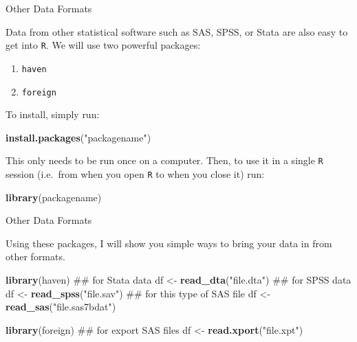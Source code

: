 \documentclass[ignorenonframetext,]{beamer}
\newenvironment{Shaded}{\begin{snugshade}}{\end{snugshade}}
\newcommand{\KeywordTok}[1]{\textcolor[rgb]{0.13,0.29,0.53}{\textbf{{#1}}}}
\newcommand{\StringTok}[1]{\textcolor[rgb]{0.31,0.60,0.02}{{#1}}}
\newcommand{\NormalTok}[1]{{#1}}
\providecommand{\tightlist}{%
\setlength{\itemsep}{0pt}\setlength{\parskip}{0pt}}
\begin{document}
\begin{frame}[fragile]{Other Data Formats}

Data from other statistical software such as SAS, SPSS, or Stata are
also easy to get into \texttt{R}. We will use two powerful packages:

\begin{enumerate}
\def\labelenumi{\arabic{enumi}.}
\tightlist
\item
  \texttt{haven}
\item
  \texttt{foreign}
\end{enumerate}

To install, simply run:

\begin{Shaded}
\begin{Highlighting}[]
\KeywordTok{install.packages}\NormalTok{(}\StringTok{"packagename"}\NormalTok{)}
\end{Highlighting}
\end{Shaded}

This only needs to be run once on a computer. Then, to use it in a
single \texttt{R} session (i.e.~from when you open \texttt{R} to when
you close it) run:

\begin{Shaded}
\begin{Highlighting}[]
\KeywordTok{library}\NormalTok{(packagename)}
\end{Highlighting}
\end{Shaded}

\end{frame}

\begin{frame}[fragile]{Other Data Formats}

Using these packages, I will show you simple ways to bring your data in
from other formats.

\begin{Shaded}
\begin{Highlighting}[]
\KeywordTok{library}\NormalTok{(haven)}
\NormalTok{## for Stata data}
\NormalTok{df <-}\StringTok{ }\KeywordTok{read_dta}\NormalTok{(}\StringTok{"file.dta"}\NormalTok{)}
\NormalTok{## for SPSS data}
\NormalTok{df <-}\StringTok{ }\KeywordTok{read_spss}\NormalTok{(}\StringTok{"file.sav"}\NormalTok{)}
\NormalTok{## for this type of SAS file}
\NormalTok{df <-}\StringTok{ }\KeywordTok{read_sas}\NormalTok{(}\StringTok{"file.sas7bdat"}\NormalTok{)}
\end{Highlighting}
\end{Shaded}

\begin{Shaded}
\begin{Highlighting}[]
\KeywordTok{library}\NormalTok{(foreign)}
\NormalTok{## for export SAS files}
\NormalTok{df <-}\StringTok{ }\KeywordTok{read.xport}\NormalTok{(}\StringTok{"file.xpt"}\NormalTok{)}
\end{Highlighting}
\end{Shaded}

\end{frame}
\end{document}
